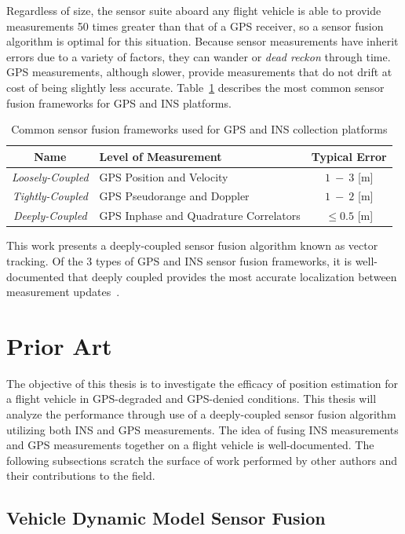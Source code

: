 Regardless of size, the sensor suite aboard any flight vehicle is able to provide measurements 50 times greater than that of a GPS receiver, so a sensor fusion algorithm is optimal for this situation. Because sensor measurements have inherit errors due to a variety of factors, they can wander or \textit{dead reckon} through time. GPS measurements, although slower, provide measurements that do not drift at cost of being slightly less accurate. Table~\ref{tbl:sensorfusionframeworks} describes the most common sensor fusion frameworks for GPS and INS platforms.
\begin{table}[!ht]\label{tbl:sensorfusionframeworks}
    \caption{Common sensor fusion frameworks used for GPS and INS collection platforms}
    \centering
    \begin{tabular}{clc}
        \toprule
        \textbf{Name}            & \textbf{Level of Measurement}          & \textbf{Typical Error} \\
        \midrule
        \textit{Loosely-Coupled} & GPS Position and Velocity              & \(1~-~3\) [m]          \\
        \textit{Tightly-Coupled} & GPS Pseudorange and Doppler            & \(1~-~2\) [m]          \\
        \textit{Deeply-Coupled}  & GPS Inphase and Quadrature Correlators & \(\leq0.5\) [m]        \\
        \bottomrule
    \end{tabular}
\end{table}
This work presents a deeply-coupled sensor fusion algorithm known as vector tracking. Of the 3 types of GPS and INS sensor fusion frameworks, it is well-documented that deeply coupled provides the most accurate localization between measurement updates~\cite{wattsGPSGLONASSL12019}.
\section{Prior Art}
The objective of this thesis is to investigate the efficacy of position estimation for a flight vehicle in GPS-degraded and GPS-denied conditions. This thesis will analyze the performance through use of a deeply-coupled sensor fusion algorithm utilizing both INS and GPS measurements. The idea of fusing INS measurements and GPS measurements together on a flight vehicle is well-documented. The following subsections scratch the surface of work performed by other authors and their contributions to the field.
\subsection{Vehicle Dynamic Model Sensor Fusion}

